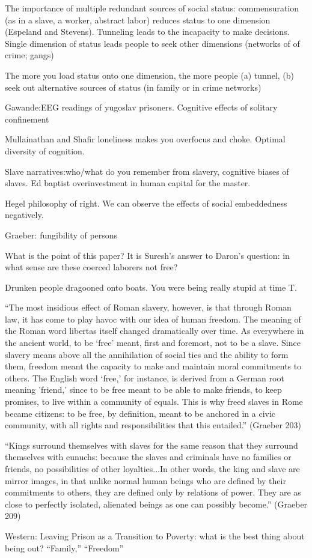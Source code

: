 \documentclass[10pt,a4paper]{article}
\begin{document}
 The importance of multiple redundant sources of social status: commensuration (as in a slave, a worker, 
 abstract labor) reduces status to one dimension (Espeland and Stevens). Tunneling leads to the incapacity 
 to make decisions. Single dimension of status leads people to seek other dimensions (networks of 
 of crime; gangs) 
 
 The more you load status onto one dimension, the more people (a) tunnel, (b) seek out alternative
 sources of status (in family or in crime networks)
 
 
 Gawande:EEG readings of yugoslav prisoners. Cognitive effects of solitary confinement
 
 Mullainathan and Shafir loneliness makes you overfocus and choke. Optimal diversity of cognition.
 
 
 Slave narratives:who/what do you remember from slavery, cognitive biases of slaves. Ed baptist overinvestment in human capital for the master.
 
 Hegel philosophy of right.
 We can observe the effects of social embeddedness negatively. 
 
 Graeber: fungibility of persons
 
 What is the point of this paper? It is Suresh's answer to Daron's question: 
 in what sense are these coerced laborers not free?
 
 Drunken people dragooned onto boats. You were being really stupid at time T. 
 
 ``The most insidious effect of Roman slavery, however, is that through Roman law, 
 it has come to play havoc with our idea of human freedom. The meaning of the Roman 
 word libertas itself changed dramatically over time. As everywhere in the ancient world, 
 to be `free' meant, first and foremost, not to be a slave. Since slavery means above all 
 the annihilation of social ties and the ability to form them, freedom meant the capacity 
 to make and maintain moral commitments to others. The English word `free,' for instance, 
 is derived from a German root meaning 'friend,' since to be free meant to be able to 
 make friends, to keep promises, to live within a community of equals. This is why freed 
 slaves in Rome became citizens: to be free, by definition, meant to be anchored in a 
 civic community, with all rights and responsibilities that this entailed.'' (Graeber 203)
 
 ``Kings surround themselves with slaves for the same reason that they surround 
 themselves with eunuchs: because the slaves and criminals have no families or friends, 
 no possibilities of other loyalties...In other words, the king and slave are mirror images, 
 in that unlike normal human beings who are defined by their commitments to others, they are 
 defined only by relations of power. They are as close to perfectly isolated, alienated 
 beings as one can possibly become.'' (Graeber 209)
 
 Western: Leaving Prison as a Transition to Poverty: what is the best thing about being out?
 ``Family,'' ``Freedom''
 
\end{document}
